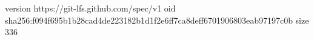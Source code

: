 version https://git-lfs.github.com/spec/v1
oid sha256:f094f695b1b28cad4de223182b1d1f2e6ff7ca8deff6701906803eab97197c0b
size 336
